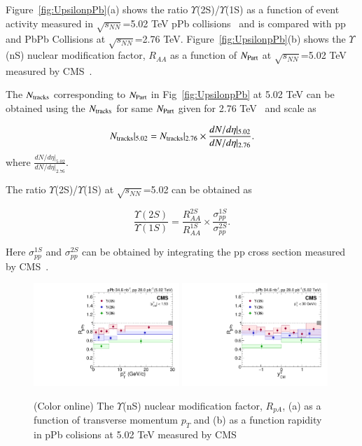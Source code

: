 Figure~\ref{fig:UpsilonpPb}(a) shows
the ratio $\Upsilon$(2S)/$\Upsilon$(1S) as a function of event activity measured in 
$\sqrt{s_{NN}}$=5.02 TeV pPb collisions~\cite{CMS:2013jsu} and is compared with pp
and PbPb Collisions at $\sqrt{s_{NN}}$=2.76 TeV.
Figure~\ref{fig:UpsilonpPb}(b) shows the $\Upsilon$(nS) nuclear modification factor, $R_{AA}$ as a function of $N_{\rm Part}$
at $\sqrt{s_{NN}}$=5.02 TeV measured by CMS~\cite{CMS:2018zza}.

  

The $N_{\rm tracks}$ corresponding to $N_{\rm Part}$ in Fig~\ref{fig:UpsilonpPb} at 5.02 TeV
can be obtained using the $N_{\rm tracks}$ for same $N_{\rm Part}$ given
for 2.76 TeV~\cite{Khachatryan:2016xxp} and scale as 

\begin{equation}
N_{\rm tracks}|_{5.02} =  N_{\rm tracks}|_{2.76} \times \frac{dN/d\eta |_{5.02}} {dN/d\eta|_{2.76}}.
\end{equation}
where $\frac{dN/d\eta |_{5.02}} {dN/d\eta|_{2.76}}$.

The ratio $\Upsilon$(2S)/$\Upsilon$(1S) at $\sqrt{s_{NN}}$=5.02 can be obtained as 

\begin{equation}
\frac{\Upsilon(2S)}{\Upsilon(1S)} = \frac{R_{AA}^{2S}}{R_{AA}^{1S}} \times \frac{\sigma_{pp}^{1S}}{\sigma_{pp}^{2S}}.
\end{equation}

Here $\sigma_{pp}^{1S}$ and $\sigma_{pp}^{2S}$ can be obtained by integrating the pp cross section
measured by CMS~\cite{CMS:2018zza}.


\begin{figure}
  \includegraphics[width=0.49\textwidth]{Figures/ExpOverview/CMS-HIN-18-005_Figure_003-a.pdf}
    \includegraphics[width=0.49\textwidth]{Figures/ExpOverview/CMS-HIN-18-005_Figure_003-b.pdf}
    \caption{(Color online) The $\Upsilon$(nS) nuclear modification factor, $R_{pA}$,
      (a) as a function of transverse momentum $p_{T}$
    and (b) as a function rapidity in pPb colisions at 5.02 TeV measured by CMS~\cite{CMS:2022wfi}
  }
  \label{fig:LHCpPb5}
\end{figure}



